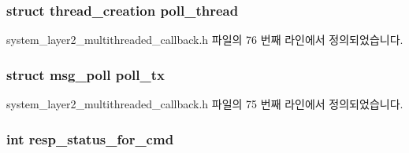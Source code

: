 \subsubsection[{\texorpdfstring{poll\+\_\+thread}{poll_thread}}]{\setlength{\rightskip}{0pt plus 5cm}struct {\bf thread\+\_\+creation} poll\+\_\+thread\hspace{0.3cm}{\ttfamily [private]}}\hypertarget{classavdecc__lib_1_1system__layer2__multithreaded__callback_a6dadabe094a6557e788353985a32a74e}{}\label{classavdecc__lib_1_1system__layer2__multithreaded__callback_a6dadabe094a6557e788353985a32a74e}


system\+\_\+layer2\+\_\+multithreaded\+\_\+callback.\+h 파일의 76 번째 라인에서 정의되었습니다.

\subsubsection[{\texorpdfstring{poll\+\_\+tx}{poll_tx}}]{\setlength{\rightskip}{0pt plus 5cm}struct {\bf msg\+\_\+poll} poll\+\_\+tx\hspace{0.3cm}{\ttfamily [private]}}\hypertarget{classavdecc__lib_1_1system__layer2__multithreaded__callback_ae4dae56698e2fac11d48cb4a1ff07378}{}\label{classavdecc__lib_1_1system__layer2__multithreaded__callback_ae4dae56698e2fac11d48cb4a1ff07378}


system\+\_\+layer2\+\_\+multithreaded\+\_\+callback.\+h 파일의 75 번째 라인에서 정의되었습니다.

\subsubsection[{\texorpdfstring{resp\+\_\+status\+\_\+for\+\_\+cmd}{resp_status_for_cmd}}]{\setlength{\rightskip}{0pt plus 5cm}int resp\+\_\+status\+\_\+for\+\_\+cmd\hspace{0.3cm}{\ttfamily [private]}}\hypertarget{classavdecc__lib_1_1system__layer2__multithreaded__callback_a6690b9a0a82de7292aef0572fcd2f842}{}\label{classavdecc__lib_1_1system__layer2__multithreaded__callback_a6690b9a0a82de7292aef0572fcd2f842}


